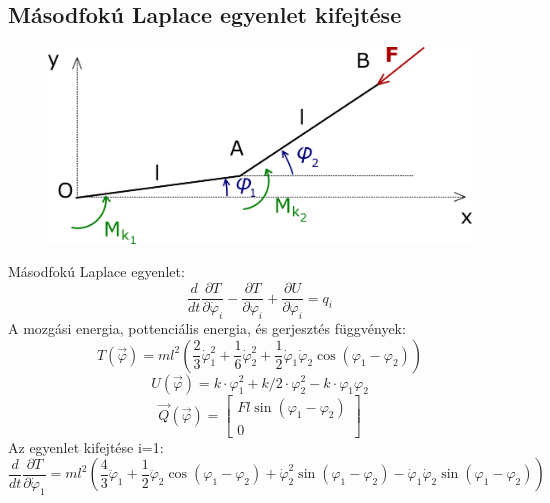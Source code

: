 \documentclass[12pt,twoside]{article}
\begin{document}
\subsection{Másodfokú Laplace egyenlet kifejtése}%
\begin{figure}[H]
\center
\includegraphics[scale=1]{2szab_koveto}
\end{figure}
Másodfokú Laplace egyenlet:
\begin{equation} \label{eq:Newton}
\frac{d}{dt}\frac{\partial T}{\partial \dot \varphi_i}-\frac{\partial T}{\partial \varphi_i}+\frac{\partial U}{\partial \varphi_i}=q_i
\end{equation}
A mozgási energia, pottenciális energia, és gerjesztés függvények:
\begin{equation} \label{eq:Newton}
T(\vec\varphi)=ml^2\left(\frac{2}{3}\dot\varphi_1^2+\frac{1}{6}\dot\varphi_2^2+
\frac{1}{2}\dot\varphi_1\dot\varphi_2 \cos(\varphi_1-\varphi_2)\right)
\end{equation}
\begin{equation} \label{eq:Newton}
U(\vec\varphi)=k \cdot \varphi_1 ^2 + k/2 \cdot\varphi_2^2 -k \cdot \varphi_1\varphi_2
\end{equation}
\begin{equation} \label{eq:Newton}
\vec Q(\vec\varphi)=
\begin{bmatrix}
Fl\sin(\varphi_1-\varphi_2) \\
0
\end{bmatrix}
\end{equation}
Az egyenlet kifejtése \newline
i=1:
\begin{equation} \label{eq:Newton}
\frac{d}{dt}\frac{\partial T}{\partial \dot \varphi_1}=
ml^2\left(\frac{4}{3} \ddot \varphi_1+\frac{1}{2}\ddot \varphi_2 \cos{(\varphi_1-\varphi_2)}+\dot\varphi_2^2\sin{(\varphi_1-\varphi_2)}-\dot\varphi_1\dot\varphi_2\sin{(\varphi_1-\varphi_2)}\right)
\end{equation}
\end{document}
